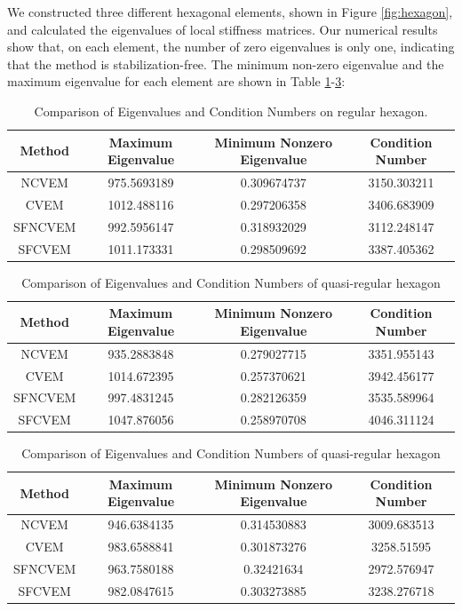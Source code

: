 \documentclass[10pt]{amsart}
\theoremstyle{definition}
\theoremstyle{remark}
\begin{document}
\begin{enumerate}[1.]
We constructed three different hexagonal elements, 
shown in Figure \ref{fig:hexagon}, and calculated the eigenvalues of local stiffness
matrices. Our numerical results show that, on each element, the number of zero
eigenvalues is only one, indicating that the method is stabilization-free. The
minimum non-zero eigenvalue and the maximum eigenvalue for each element are
shown in Table \ref{tab:comparison0}-\ref{tab:comparison2}:

\begin{table}[h]
\centering
\caption{Comparison of Eigenvalues and Condition Numbers on regular hexagon.}
\label{tab:comparison0}
\begin{tabular}{c|ccc}
\toprule
\textbf{Method} & \textbf{Maximum Eigenvalue} & \textbf{Minimum Nonzero
Eigenvalue} & \textbf{Condition Number} \\ \hline
NCVEM & 975.5693189 & 0.309674737 & 3150.303211 \\ \hline
CVEM & 1012.488116 & 0.297206358 & 3406.683909 \\ \hline
SFNCVEM & 992.5956147 & 0.318932029 & 3112.248147 \\ \hline
SFCVEM & 1011.173331 & 0.298509692 & 3387.405362 \\
\bottomrule
\end{tabular}
\end{table}

\begin{table}[h]
\centering
\caption{Comparison of Eigenvalues and Condition Numbers of quasi-regular hexagon}
\label{tab:comparison1}
\begin{tabular}{c|ccc}
\toprule
\textbf{Method} & \textbf{Maximum Eigenvalue} & \textbf{Minimum Nonzero
Eigenvalue} & \textbf{Condition Number} \\ \hline
NCVEM   & 935.2883848 & 0.279027715 & 3351.955143 \\ \hline
CVEM    & 1014.672395 & 0.257370621 & 3942.456177 \\ \hline
SFNCVEM & 997.4831245 & 0.282126359 & 3535.589964 \\ \hline
SFCVEM  & 1047.876056 & 0.258970708 &
4046.311124 \\
\bottomrule
\end{tabular}
\end{table}

\begin{table}[h]
\centering
\caption{Comparison of Eigenvalues and Condition Numbers of quasi-regular hexagon}
\label{tab:comparison2}
\begin{tabular}{c|ccc}
\toprule
\textbf{Method} & \textbf{Maximum Eigenvalue} & \textbf{Minimum Nonzero
Eigenvalue} & \textbf{Condition Number} \\ \hline
 NCVEM   & 946.6384135 & 0.314530883 & 3009.683513 \\ \hline
 CVEM    & 983.6588841 & 0.301873276 & 3258.51595 \\ \hline
 SFNCVEM & 963.7580188 & 0.32421634 & 2972.576947 \\ \hline
 SFCVEM  & 982.0847615 & 0.303273885 & 3238.276718 \\
\bottomrule
\end{tabular}
\end{table}



\end{enumerate}
\end{document}
